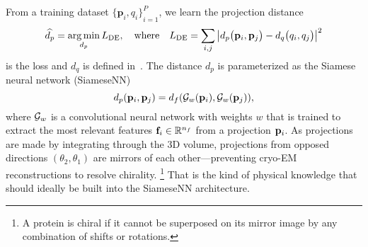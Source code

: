 From a training dataset ${\{ \mathbf{p}_{i}, q_i \}}_{i=1}^{P}$, we learn the projection distance
\begin{equation}
    \widehat{d_p} = \operatorname*{arg\,min}_{d_p} L_\text{DE},
    \quad \text{where} \quad
    L_\text{DE} = \sum_{i,j} \left| d_p\big(\mathbf{p}_{i},\mathbf{p}_{j}\big) - d_q\big(q_i,q_j\big) \right|^2
    \label{eqn:distance-learning}
\end{equation}
is the loss and $d_q$ is defined in~.
The distance $d_p$ is parameterized as the Siamese neural network (SiameseNN)~\cite{chopra2005learning}
\begin{equation*}
    d_p(\mathbf{p}_i, \mathbf{p}_j) = d_f(\mathcal{G}_w(\mathbf{p}_i), \mathcal{G}_w(\mathbf{p}_j)),
\end{equation*}
where $\mathcal{G}_w$ is a convolutional neural network with weights $w$ that is trained to extract the most relevant features $\mathbf{f}_i \in \mathbb{R}^{n_f}$ from a projection $\mathbf{p}_i$.
As projections are made by integrating through the 3D volume, projections from opposed directions $(\theta_2,\theta_1)$ are mirrors of each other---preventing cryo-EM reconstructions to resolve chirality.%
\footnote{A protein is chiral if it cannot be superposed on its mirror image by any combination of shifts or rotations.}
That is the kind of physical knowledge that should ideally be built into the SiameseNN architecture.

